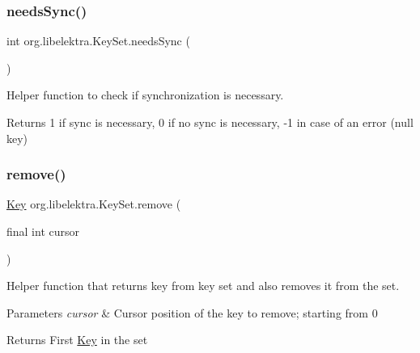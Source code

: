 \subsubsection{\texorpdfstring{needs\+Sync()}{needsSync()}}
{\footnotesize\ttfamily int org.\+libelektra.\+Key\+Set.\+needs\+Sync (\begin{DoxyParamCaption}{ }\end{DoxyParamCaption})\hspace{0.3cm}{\ttfamily [inline]}}



Helper function to check if synchronization is necessary. 

\begin{DoxyReturn}{Returns}
1 if sync is necessary, 0 if no sync is necessary, -\/1 in case of an error (null key) 
\end{DoxyReturn}
\mbox{\label{classorg_1_1libelektra_1_1KeySet_abd5cf0646744448c84a5bbcbf7a833b1}} 
\subsubsection{\texorpdfstring{remove()}{remove()}}
{\footnotesize\ttfamily \hyperlink{classorg_1_1libelektra_1_1Key}{Key} org.\+libelektra.\+Key\+Set.\+remove (\begin{DoxyParamCaption}\item[{final int}]{cursor }\end{DoxyParamCaption})\hspace{0.3cm}{\ttfamily [inline]}}



Helper function that returns key from key set and also removes it from the set. 


\begin{DoxyParams}{Parameters}
{\em cursor} & Cursor position of the key to remove; starting from 0 \\
\hline
\end{DoxyParams}
\begin{DoxyReturn}{Returns}
First \hyperlink{classorg_1_1libelektra_1_1Key}{Key} in the set 
\end{DoxyReturn}
\mbox{\label{classorg_1_1libelektra_1_1KeySet_ab81aff6c88595b3f4c3307d1f996857f}} 
